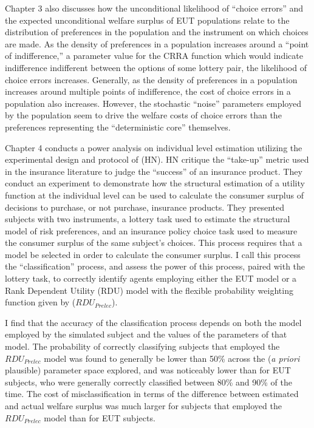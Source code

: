 \documentclass[../main.tex]{subfiles}
\begin{document}
Chapter 3 also discusses how the unconditional likelihood of \enquote{choice errors} and the expected unconditional welfare surplus of EUT populations relate to the distribution of preferences in the population and the instrument on which choices are made.
As the density of preferences in a population increases around a \enquote{point of indifference,} a parameter value for the CRRA function which would indicate indifference indifferent between the options of some lottery pair, the likelihood of choice errors increases.
Generally, as the density of preferences in a population increases around multiple points of indifference, the cost of choice errors in a population also increases.
However, the stochastic \enquote{noise} parameters employed by the population seem to drive the welfare costs of choice errors than the preferences representing the \enquote{deterministic core} themselves.

Chapter 4 conducts a power analysis on individual level estimation utilizing the experimental design and protocol of \textcite{Harrison2016} (HN).
HN critique the \enquote{take-up} metric used in the insurance literature to judge the \enquote{success} of an insurance product.
They conduct an experiment to demonstrate how the structural estimation of a utility function at the individual level can be used to calculate the consumer surplus of decisions to purchase, or not purchase, insurance products.
They presented subjects with two instruments, a lottery task used to estimate the structural model of risk preferences, and an insurance policy choice task used to measure the consumer surplus of the same subject's choices.
This process requires that a model be selected in order to calculate the consumer surplus.
I call this process the \enquote{classification} process, and assess the power of this process, paired with the lottery task, to correctly identify agents employing either the EUT model or a Rank Dependent Utility (RDU) model with the flexible probability weighting function given by \textcite{Prelec1998} ($\mathit{RDU_{Prelec}}$).

I find that the accuracy of the classification process depends on both the model employed by the simulated subject and the values of the parameters of that model.
The probability of correctly classifying subjects that employed the $\mathit{RDU_{Prelec}}$ model was found to generally be lower than 50\% across the (\textit{a priori} plausible) parameter space explored, and was noticeably lower than for EUT subjects, who were generally correctly classified between 80\% and 90\% of the time.
The cost of misclassification in terms of the difference between estimated and actual welfare surplus was much larger for subjects that employed the $\mathit{RDU_{Prelec}}$ model than for EUT subjects.
\end{document}
